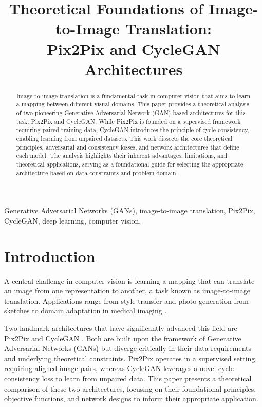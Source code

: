 \documentclass[journal]{IEEEtran}
\title{Theoretical Foundations of Image-to-Image Translation: \\ Pix2Pix and CycleGAN Architectures}
\author{
\IEEEauthorblockN{Brandon Marquez Salazar}
}
\begin{document}
\maketitle

\begin{abstract}

 Image-to-image translation is a fundamental task in computer vision that
 aims to learn a mapping between different visual domains. This paper
 provides a theoretical analysis of two pioneering Generative Adversarial
 Network (GAN)-based architectures for this task: Pix2Pix and CycleGAN.
 While Pix2Pix is founded on a supervised framework requiring paired
 training data, CycleGAN introduces the principle of cycle-consistency,
 enabling learning from unpaired datasets. This work dissects the core
 theoretical principles, adversarial and consistency losses, and network
 architectures that define each model. The analysis highlights their
 inherent advantages, limitations, and theoretical applications, serving
 as a foundational guide for selecting the appropriate architecture based
 on data constraints and problem domain.

\end{abstract}

\begin{IEEEkeywords}

 Generative Adversarial Networks (GANs), image-to-image translation,
 Pix2Pix, CycleGAN, deep learning, computer vision.

\end{IEEEkeywords}

\section{Introduction}

 A central challenge in computer vision is learning a mapping that can
 translate an image from one representation to another, a task known as
 image-to-image translation. Applications range from style transfer and
 photo generation from sketches to domain adaptation in medical imaging
 \cite{Isola2017}.

 Two landmark architectures that have significantly advanced this field
 are Pix2Pix \cite{Isola2017} and CycleGAN \cite{Zhu2017}. Both are built
 upon the framework of Generative Adversarial Networks (GANs) but diverge
 critically in their data requirements and underlying theoretical
 constraints. Pix2Pix operates in a supervised setting, requiring aligned
 image pairs, whereas CycleGAN leverages a novel cycle-consistency loss to
 learn from unpaired data. This paper presents a theoretical comparison of
 these two architectures, focusing on their foundational principles,
 objective functions, and network designs to inform their appropriate
 application.
\end{document}
